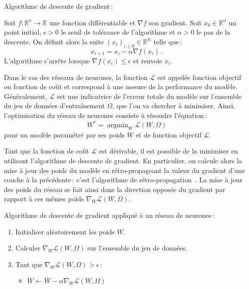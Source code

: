 \begin{definition}
  \label{eq:sgd}
  Algorithme de descente de gradient\,:

  Soit $f : \mathbb{R}^n \rightarrow \mathbb{R}$ une fonction différentiable et $\nabla f$ son gradient. Soit $x_0 \in \mathbb{R}^n$ un point initial, $\epsilon > 0$ le seuil de tolérance de l'algorithme et $\alpha > 0$ le pas de la descente. On définit alors la suite $(x_i)_{i \ge 0} \in \mathbb{R}^\mathbb{N}$ telle que\,:
  $$x_{i+1} = x_i - \alpha \nabla f(x_i)~.$$
  L'algorithme s'arrête lorsque $\nabla f(x_i) \le \epsilon$ et renvoie $x_i$.
\end{definition}

\def\L{\mathcal{L}}

Dans le cas des réseaux de neurones, la fonction $\L$ est appelée \og fonction objectif \fg ou \og fonction de coût \fg et correspond à une mesure de la performance du modèle. Généralement, $\L$ est une indicatrice de l'erreur totale du modèle sur l'ensemble du jeu de données d'entraînement $\Omega$, que l'on va chercher à minimiser. Ainsi, l'optimisation du réseau de neurones consiste à résoudre l'équation\,:
$$W^* = \operatorname{argmin}_W \L(W, \Omega)$$
pour un modèle paramétré par ses poids $W$ et de fonction objectif $\L$.

Tant que la fonction de coût $\L$ est dérivable, il est possible de la minimiser en utilisant l'algorithme de descente de gradient. En particulier, on calcule alors la mise à jour des poids du modèle en rétro-propageant la valeur du gradient d'une couche à la précédente\,: c'est l'algorithme de rétro-propagation~\cite{werbos_beyond_1975,lecun_efficient_1998,rumelhart_learning_1986}. La mise à jour des poids du réseau se fait ainsi dans la direction opposée du gradient par rapport à ces mêmes poids $\nabla_W \L(W, \Omega)$.

\begin{definition}
  Algorithme de descente de gradient appliqué à un réseau de neurones\,:
  \begin{enumerate}
    \item Initialiser aléatoirement les poids $W$.
    \item Calculer $\nabla_W \L(W, \Omega)$ sur l'ensemble du jeu de données.
    \item Tant que $\nabla_W \L(W, \Omega) > \epsilon$\,:
      \begin{itemize}
          \item $W \leftarrow W - \alpha \nabla_W \L(W, \Omega)$
      \end{itemize}
  \end{enumerate}
\end{definition}

